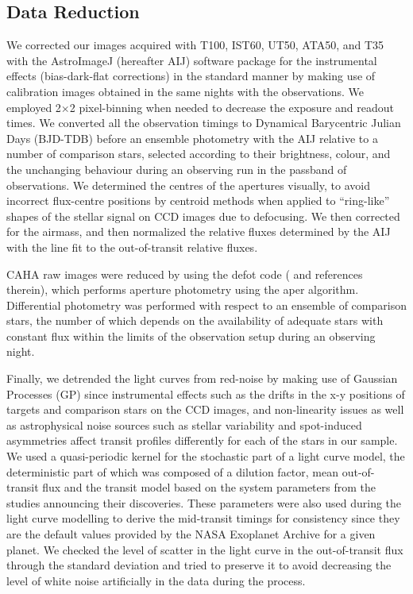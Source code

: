 \documentclass[a4paper,fleqn,usenatbib]{mnras}
\begin{document}
\subsection{Data Reduction}
\label{subsec:data_reduction}
We corrected our images acquired with T100, IST60, UT50, ATA50, and T35 with the AstroImageJ (hereafter AIJ) software package \citep{2017AJ....153...77C} for the instrumental effects (bias-dark-flat corrections) in the standard manner by making use of calibration images obtained in the same nights with the observations. We employed 2$\times$2 pixel-binning when needed to decrease the exposure and readout times. We converted all the observation timings to Dynamical Barycentric Julian Days (BJD-TDB) before an ensemble photometry \citep{1992PASP..104..435H} with the AIJ relative to a number of comparison stars, selected according to their brightness, colour, and the unchanging behaviour during an observing run in the passband of observations. We determined the centres of the apertures visually, to avoid incorrect flux-centre positions by centroid methods when applied to ``ring-like'' shapes of the stellar signal on CCD images due to defocusing. We then corrected for the airmass, and then normalized the relative fluxes determined by the AIJ with the line fit to the out-of-transit relative fluxes. 

CAHA raw images were reduced by using the {\sc defot} code (\cite{2014MNRAS.444..776S} and references therein), which performs aperture photometry using the {\sc aper} algorithm. Differential photometry was performed with respect to an ensemble of comparison stars, the number of which depends on the availability of adequate stars with constant flux within the limits of the observation setup during an observing night.

Finally, we detrended the light curves from red-noise by making use of Gaussian Processes (GP) since instrumental effects such as the drifts in the x-y positions of targets and comparison stars on the CCD images, and non-linearity issues as well as astrophysical noise sources such as stellar variability and spot-induced asymmetries affect transit profiles differently for each of the stars in our sample. We used a quasi-periodic kernel for the stochastic part of a light curve model, the deterministic part of which was composed of a dilution factor, mean out-of-transit flux and the transit model based on the system parameters from the studies announcing their discoveries. These parameters were also used during the light curve modelling  to derive the mid-transit timings for consistency since they are the default values provided by the NASA Exoplanet Archive for a given planet. We checked the level of scatter in the light curve in the out-of-transit flux through the standard deviation and tried to preserve it to avoid decreasing the level of white noise artificially in the data during the process.
\end{document}

